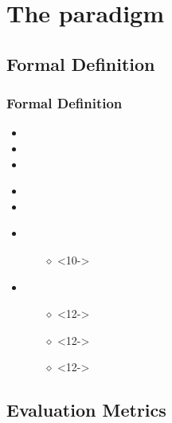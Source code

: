 \documentclass{beamer}
\begin{document}
\section{The paradigm}
\subsection{Formal Definition} %

\begin{frame}
\frametitle{Formal Definition}

\begin{itemize}
\item <3-> 
\item <4-> 
\item <5-> 
\end{itemize}
\begin{itemize}
\item <7-> 
\item <8-> 
\end{itemize} 

\begin{itemize}
\item <10-> 
\begin{itemize}
\item [$\diamond$]<10->
\end{itemize}
\item <11-> 
\begin{itemize}
\item [$\diamond$]<12-> 
\item [$\diamond$]<12-> 
\item [$\diamond$]<12->
\end{itemize}
\end{itemize}

\end{frame}


\subsection{Evaluation Metrics} %
\end{document}
